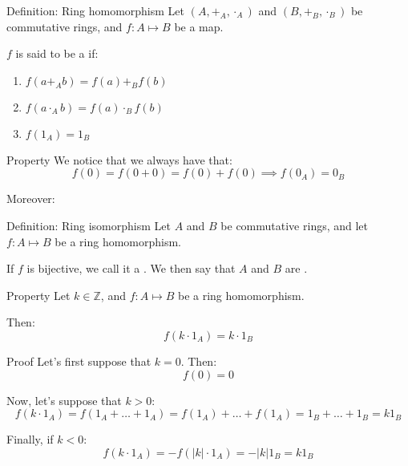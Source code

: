 \documentclass[a4paper]{article}
\begin{document}
\begin{parag}{Definition: Ring homomorphism}
    Let $\left(A, +_A, \cdot_A \right)$ and $\left(B, +_B, \cdot_B \right)$ be commutative rings, and $f: A \mapsto B$ be a map.

    $f$ is said to be a  if:
    \begin{enumerate}
        \item $f\left(a +_A b\right) = f\left(a\right) +_B f\left(b\right)$
        \item $f\left(a\cdot_A b\right) = f\left(a\right)\cdot_B f\left(b\right)$
        \item $f\left(1_A\right) = 1_B$
    \end{enumerate}

    \begin{subparag}{Property}
        We notice that we always  have that: 
        \[f\left(0\right)= f\left(0 + 0\right) = f\left(0\right) + f\left(0\right) \implies f\left(0_A\right) = 0_B\]

        Moreover: 
    \end{subparag}
\end{parag}

\begin{parag}{Definition: Ring isomorphism}
    Let $A$ and $B$ be commutative rings, and let $f: A \mapsto B$ be a ring homomorphism.

    If $f$ is bijective, we call it a . We then say that $A$ and $B$ are .
\end{parag}

\begin{parag}{Property}
    Let $k \in \mathbb{Z}$, and $f: A \mapsto B$ be a ring homomorphism.

    Then: 
    \[f\left(k\cdot 1_A\right) = k\cdot 1_B\]
    
    \begin{subparag}{Proof}
        Let's first suppose that $k = 0$. Then: 
        \[f\left(0\right) = 0\]
        
        Now, let's suppose that $k > 0$: 
        \[f\left(k\cdot 1_A\right) = f\left(1_A + \ldots + 1_A\right) = f\left(1_A\right) + \ldots + f\left(1_A\right) = 1_B + \ldots + 1_B = k 1_B\]
        
        Finally, if $k < 0$: 
        \[f\left(k \cdot 1_A\right) = -f\left(\left|k\right| \cdot 1_A\right) = -\left|k\right| 1_B = k 1_B\]
    \end{subparag}
\end{parag}
\end{document}
